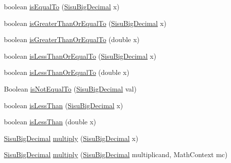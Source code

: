 \begin{DoxyCompactItemize}
\item 
boolean \hyperlink{classcom_1_1aarrelaakso_1_1drawl_1_1_sisu_big_decimal_a0c8a57da15ab119fd46af9292ccfe028}{is\+Equal\+To} (\hyperlink{classcom_1_1aarrelaakso_1_1drawl_1_1_sisu_big_decimal}{Sisu\+Big\+Decimal} x)
\item 
boolean \hyperlink{classcom_1_1aarrelaakso_1_1drawl_1_1_sisu_big_decimal_aa6c1b25dee6e289b50c85dd9e03df0f6}{is\+Greater\+Than\+Or\+Equal\+To} (\hyperlink{classcom_1_1aarrelaakso_1_1drawl_1_1_sisu_big_decimal}{Sisu\+Big\+Decimal} x)
\item 
boolean \hyperlink{classcom_1_1aarrelaakso_1_1drawl_1_1_sisu_big_decimal_a45b9c8df4d34618db924c5d1b460a1ed}{is\+Greater\+Than\+Or\+Equal\+To} (double x)
\item 
boolean \hyperlink{classcom_1_1aarrelaakso_1_1drawl_1_1_sisu_big_decimal_ac809a1deb4723c852a7737e9a40eb57e}{is\+Less\+Than\+Or\+Equal\+To} (\hyperlink{classcom_1_1aarrelaakso_1_1drawl_1_1_sisu_big_decimal}{Sisu\+Big\+Decimal} x)
\item 
boolean \hyperlink{classcom_1_1aarrelaakso_1_1drawl_1_1_sisu_big_decimal_a2644e7161a3022a10d2fa99f95ba051e}{is\+Less\+Than\+Or\+Equal\+To} (double x)
\item 
Boolean \hyperlink{classcom_1_1aarrelaakso_1_1drawl_1_1_sisu_big_decimal_a855e56f2f721da7239fb0f41f42dc705}{is\+Not\+Equal\+To} (\hyperlink{classcom_1_1aarrelaakso_1_1drawl_1_1_sisu_big_decimal}{Sisu\+Big\+Decimal} val)
\item 
boolean \hyperlink{classcom_1_1aarrelaakso_1_1drawl_1_1_sisu_big_decimal_acd8d9994b3096998bb2a059d2782e883}{is\+Less\+Than} (\hyperlink{classcom_1_1aarrelaakso_1_1drawl_1_1_sisu_big_decimal}{Sisu\+Big\+Decimal} x)
\item 
boolean \hyperlink{classcom_1_1aarrelaakso_1_1drawl_1_1_sisu_big_decimal_a52d08adc0b258586bda854b6a4e31e9e}{is\+Less\+Than} (double x)
\item 
\hyperlink{classcom_1_1aarrelaakso_1_1drawl_1_1_sisu_big_decimal}{Sisu\+Big\+Decimal} \hyperlink{classcom_1_1aarrelaakso_1_1drawl_1_1_sisu_big_decimal_a4ad514df6c27aa8eb865a9dead5a54fd}{multiply} (\hyperlink{classcom_1_1aarrelaakso_1_1drawl_1_1_sisu_big_decimal}{Sisu\+Big\+Decimal} x)
\item 
\hyperlink{classcom_1_1aarrelaakso_1_1drawl_1_1_sisu_big_decimal}{Sisu\+Big\+Decimal} \hyperlink{classcom_1_1aarrelaakso_1_1drawl_1_1_sisu_big_decimal_a3315f77c2c03249816eacafd25a1d0ab}{multiply} (\hyperlink{classcom_1_1aarrelaakso_1_1drawl_1_1_sisu_big_decimal}{Sisu\+Big\+Decimal} multiplicand, Math\+Context mc)

\end{DoxyCompactItemize}
